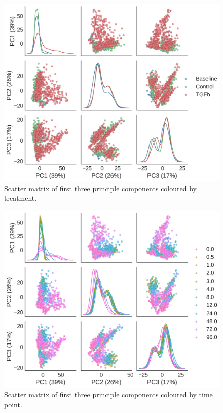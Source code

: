 \documentclass[alpha-refs]{wiley-article}
\begin{document}
\begin{figure}
	\centering
	\includegraphics[height=0.45\textheight]{img/qc/treatment}
	\caption{Scatter matrix of first three principle components coloured by treatment.}
	\label{fig:qc:treatment}
\end{figure}

\begin{figure}
	\centering
	\includegraphics[height=0.45\textheight]{img/qc/time_point}
	\caption{Scatter matrix of first three principle components coloured by time point.}
	\label{fig:qc:time_point}
\end{figure}
\end{document}
